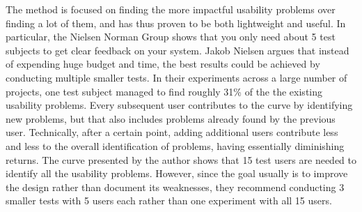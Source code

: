 The method is focused on finding the more impactful usability problems over finding a lot of them, and has thus proven to be both lightweight and useful. In particular, the Nielsen Norman Group\cite{5Users} shows that you only need about 5 test subjects to get clear feedback on your system. Jakob Nielsen argues that instead of expending huge budget and time, the best results could be achieved by conducting multiple smaller tests. In their experiments across a large number of projects, one test subject managed to find roughly 31\% of the the existing usability problems. Every subsequent user contributes to the curve by identifying new problems, but that also includes problems already found by the previous user. Technically, after a certain point, adding additional users contribute less and less to the overall identification of problems, having essentially diminishing returns. The curve presented by the author shows that 15 test users are needed to identify all the usability problems. However, since the goal usually is to improve the design rather than document its weaknesses, they recommend conducting 3 smaller tests with 5 users each rather than one experiment with all 15 users.